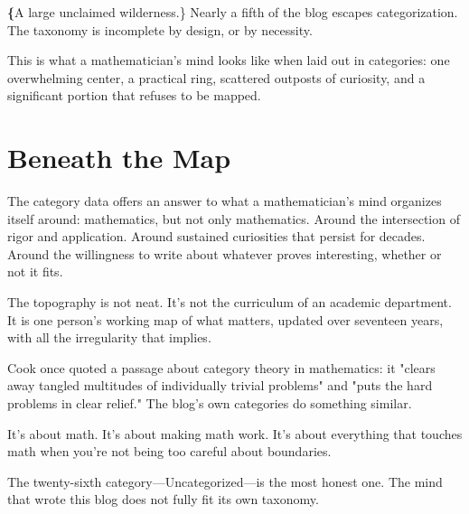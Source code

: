 \textbf\{A large unclaimed wilderness.\} Nearly a fifth of the blog escapes categorization. The taxonomy is incomplete by design, or by necessity.

This is what a mathematician's mind looks like when laid out in categories: one overwhelming center, a practical ring, scattered outposts of curiosity, and a significant portion that refuses to be mapped.

\bigskip

\section*{Beneath the Map}

The category data offers an answer to what a mathematician's mind organizes itself around: mathematics, but not only mathematics. Around the intersection of rigor and application. Around sustained curiosities that persist for decades. Around the willingness to write about whatever proves interesting, whether or not it fits.

The topography is not neat. It's not the curriculum of an academic department. It is one person's working map of what matters, updated over seventeen years, with all the irregularity that implies.

Cook once quoted a passage about category theory in mathematics: it "clears away tangled multitudes of individually trivial problems" and "puts the hard problems in clear relief." The blog's own categories do something similar.

It's about math. It's about making math work. It's about everything that touches math when you're not being too careful about boundaries.

The twenty-sixth category—Uncategorized—is the most honest one. The mind that wrote this blog does not fully fit its own taxonomy.
